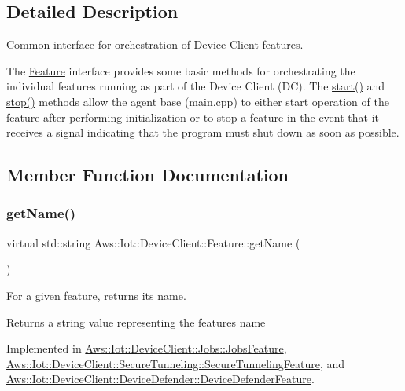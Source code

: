 \subsection{Detailed Description}
Common interface for orchestration of Device Client features. 

The \hyperlink{class_aws_1_1_iot_1_1_device_client_1_1_feature}{Feature} interface provides some basic methods for orchestrating the individual features running as part of the Device Client (DC). The \hyperlink{class_aws_1_1_iot_1_1_device_client_1_1_feature_ac9a936ebd88f7e35914a6aac99badf7d}{start()} and \hyperlink{class_aws_1_1_iot_1_1_device_client_1_1_feature_a5b672f7b1403512cad9104ba923fc73d}{stop()} methods allow the agent base (main.\+cpp) to either start operation of the feature after performing initialization or to stop a feature in the event that it receives a signal indicating that the program must shut down as soon as possible. 

\subsection{Member Function Documentation}
\mbox{\label{class_aws_1_1_iot_1_1_device_client_1_1_feature_a7f56b81457898d67ddc1942e57e3c0d5}} 
\subsubsection{\texorpdfstring{get\+Name()}{getName()}}
{\footnotesize\ttfamily virtual std\+::string Aws\+::\+Iot\+::\+Device\+Client\+::\+Feature\+::get\+Name (\begin{DoxyParamCaption}{ }\end{DoxyParamCaption})\hspace{0.3cm}{\ttfamily [pure virtual]}}



For a given feature, returns its name. 

\begin{DoxyReturn}{Returns}
a string value representing the feature\textquotesingle{}s name 
\end{DoxyReturn}


Implemented in \hyperlink{class_aws_1_1_iot_1_1_device_client_1_1_jobs_1_1_jobs_feature_a88bff915e713b132ce5a49a3d60ba294}{Aws\+::\+Iot\+::\+Device\+Client\+::\+Jobs\+::\+Jobs\+Feature}, \hyperlink{class_aws_1_1_iot_1_1_device_client_1_1_secure_tunneling_1_1_secure_tunneling_feature_accc93db855be85847c3472754439594f}{Aws\+::\+Iot\+::\+Device\+Client\+::\+Secure\+Tunneling\+::\+Secure\+Tunneling\+Feature}, and \hyperlink{class_aws_1_1_iot_1_1_device_client_1_1_device_defender_1_1_device_defender_feature_a5d1c425fb35d74caff528e7b59026211}{Aws\+::\+Iot\+::\+Device\+Client\+::\+Device\+Defender\+::\+Device\+Defender\+Feature}.

